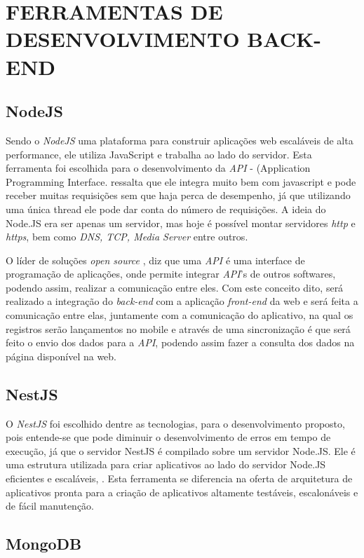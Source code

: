 \section{FERRAMENTAS DE DESENVOLVIMENTO BACK-END}

\subsection{NodeJS}
Sendo o \textit{NodeJS} uma plataforma para construir aplicações web escaláveis de alta performance, ele utiliza JavaScript e trabalha ao lado do servidor. Esta ferramenta foi escolhida para o desenvolvimento da \textit{API} - (Application Programming Interface.  ressalta que ele integra muito bem com javascript e pode receber muitas requisições sem que haja perca de desempenho, já que utilizando uma única thread ele pode dar conta do número de requisições. A ideia do Node.JS era ser apenas um servidor, mas hoje é possível montar servidores \textit{http} e \textit{https}, bem como \textit{DNS, TCP, Media Server} entre outros.

O líder de soluções \textit{open source} , diz que uma \textit{API} é uma interface de programação de aplicações, onde permite integrar \textit{API}'s de outros softwares, podendo assim, realizar a comunicação entre eles. Com este conceito dito, será realizado a integração do \textit{back-end} com a aplicação \textit{front-end} da web e será feita a comunicação entre elas, juntamente com a comunicação do aplicativo, na qual os registros serão lançamentos no mobile e através de uma sincronização é que será feito o envio dos dados para a \textit{API}, podendo assim fazer a consulta dos dados na página disponível na web.

\subsection{NestJS}
O \textit{NestJS} foi escolhido dentre as tecnologias, para o desenvolvimento proposto, pois entende-se que pode diminuir o desenvolvimento de erros em tempo de execução, já que o servidor NestJS é compilado sobre um servidor Node.JS. Ele é uma estrutura utilizada para criar aplicativos ao lado do servidor Node.JS eficientes e escaláveis, . Esta ferramenta se diferencia na oferta de arquitetura de aplicativos pronta para a criação de aplicativos altamente testáveis, escalonáveis e de fácil manutenção.


\subsection{MongoDB}

